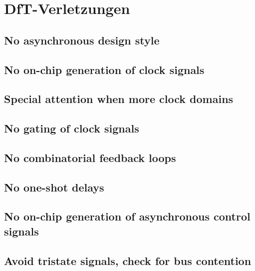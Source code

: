 \documentclass[12pt,a4paper]{article}
\begin{document}
\section{DfT-Verletzungen}

\subsection{No asynchronous design style}

\subsection{No on-chip generation of clock signals}

\subsection{Special attention when more clock domains}

\subsection{No gating of clock signals}

\subsection{No combinatorial feedback loops}

\subsection{No one-shot delays}

\subsection{No on-chip generation of asynchronous control signals}

\subsection{Avoid tristate signals, check for bus contention}
\end{document}
